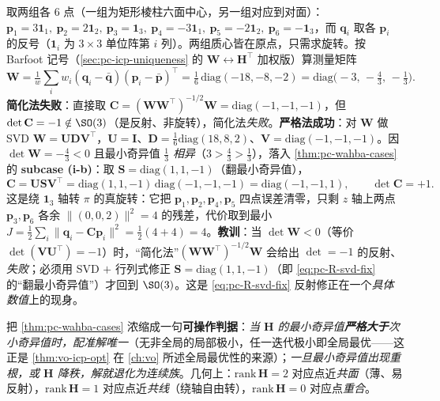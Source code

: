 \begin{derivation}
取两组各 $6$ 点（一组为矩形棱柱六面中心，另一组对应到对面）：$\mathbf{p}_1{=}3\mathbf{1}_1,\ \mathbf{p}_2{=}2\mathbf{1}_2,\ \mathbf{p}_3{=}\mathbf{1}_3,\ \mathbf{p}_4{=}{-}3\mathbf{1}_1,\ \mathbf{p}_5{=}{-}2\mathbf{1}_2,\ \mathbf{p}_6{=}{-}\mathbf{1}_3$，而 $\mathbf{q}_i$ 取各 $\mathbf{p}_i$ 的反号（$\mathbf{1}_i$ 为 $3\times3$ 单位阵第 $i$ 列）。两组质心皆在原点，只需求旋转。按 Barfoot 记号（\cref{sec:pc-icp-uniqueness} 的 $\mathbf{W}\leftrightarrow\mathbf{H}^\top$ 加权版）算测量矩阵
\begin{equation}
  \mathbf{W}=\tfrac1w\sum_i w_i(\mathbf{q}_i-\bar{\mathbf{q}})(\mathbf{p}_i-\bar{\mathbf{p}})^\top
  =\tfrac16\,\mathrm{diag}(-18,-8,-2)=\mathrm{diag}\!\big({-}3,\,{-}\tfrac43,\,{-}\tfrac13\big).
  \label{eq:pc-wahba-example-W}
\end{equation}
\textbf{简化法失败}：直接取 $\mathbf{C}=(\mathbf{W}\mathbf{W}^\top)^{-1/2}\mathbf{W}=\mathrm{diag}(-1,-1,-1)$，但 $\det\mathbf{C}=-1\notin\SO(3)$（是反射、非旋转），简化法\emph{失败}。\textbf{严格法成功}：对 $\mathbf{W}$ 做 SVD $\mathbf{W}=\mathbf{U}\mathbf{D}\mathbf{V}^\top$，$\mathbf{U}=\mathbf{I}$、$\mathbf{D}=\tfrac16\mathrm{diag}(18,8,2)$、$\mathbf{V}=\mathrm{diag}(-1,-1,-1)$。因 $\det\mathbf{W}=-\tfrac43<0$ 且最小奇异值 $\tfrac13$ \emph{相异}（$3>\tfrac43>\tfrac13$），落入 \cref{thm:pc-wahba-cases} 的 \textbf{subcase (i-b)}：取 $\mathbf{S}=\mathrm{diag}(1,1,-1)$（翻最小奇异值），
\begin{equation}
  \mathbf{C}=\mathbf{U}\mathbf{S}\mathbf{V}^\top=\mathrm{diag}(1,1,-1)\,\mathrm{diag}(-1,-1,-1)=\mathrm{diag}(-1,-1,1),\qquad \det\mathbf{C}=+1.
  \label{eq:pc-wahba-example-C}
\end{equation}
这是绕 $\mathbf{1}_3$ 轴转 $\pi$ 的真旋转：它把 $\mathbf{p}_1,\mathbf{p}_2,\mathbf{p}_4,\mathbf{p}_5$ 四点误差清零，只剩 $z$ 轴上两点 $\mathbf{p}_3,\mathbf{p}_6$ 各余 $\|(0,0,2)\|^2=4$ 的残差，代价取到最小 $J=\tfrac12\sum_i\|\mathbf{q}_i-\mathbf{C}\mathbf{p}_i\|^2=\tfrac12(4{+}4)=4$。\textbf{教训}：当 $\det\mathbf{W}<0$（等价 $\det(\mathbf{V}\mathbf{U}^\top)=-1$）时，“简化法”$(\mathbf{W}\mathbf{W}^\top)^{-1/2}\mathbf{W}$ 会给出 $\det=-1$ 的反射、\emph{失败}；必须用 SVD $+$ 行列式修正 $\mathbf{S}=\mathrm{diag}(1,1,-1)$（即 \cref{eq:pc-R-svd-fix} 的“翻最小奇异值”）才回到 $\SO(3)$。这是 \cref{eq:pc-R-svd-fix} 反射修正在一个\emph{具体数值}上的现身。
\end{derivation}

\begin{insight}
把 \cref{thm:pc-wahba-cases} 浓缩成一句\textbf{可操作判据}：\emph{当 $\mathbf{H}$ 的最小奇异值\textbf{严格大于}次小奇异值时，配准解唯一}（无非全局的局部极小，任一迭代极小即全局最优——这正是 \cref{thm:vo-icp-opt} 在 \cref{ch:vo} 所述全局最优性的来源）；\emph{一旦最小奇异值出现重根，或 $\mathbf{H}$ 降秩，解就退化为连续族}。几何上：$\mathrm{rank}\,\mathbf{H}=2$ 对应点近\emph{共面}（薄、易反射），$\mathrm{rank}\,\mathbf{H}=1$ 对应点近\emph{共线}（绕轴自由转），$\mathrm{rank}\,\mathbf{H}=0$ 对应点\emph{重合}。
\end{insight}

